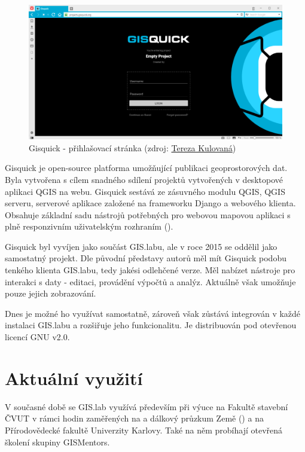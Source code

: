 \begin{figure}[H] \centering
    \includegraphics[width=400pt]{./pictures/gisquick-welcome-screen.png}
    \caption[Gisquick - přihlašovací stránka]{Gisquick - přihlašovací stránka (zdroj:
	\href{}{Tereza Kulovaná})}
    \label{fig:gisquick-welcome}
\end{figure}

Gisquick je open-source platforma umožňující publikaci geoprostorových
dat. Byla vytvořena s cílem snadného sdílení projektů vytvořených v
desktopové aplikaci QGIS na webu. Gisquick sestává ze zásuvného modulu
QGIS, QGIS serveru, serverové aplikace založené na frameworku Django a 
webového klienta. Obsahuje základní sadu nástrojů
potřebných pro webovou mapovou aplikaci s plně responzivním uživatelským
rozhraním ().

Gisquick byl vyvíjen jako součást GIS.labu, ale v roce 2015 se oddělil
jako samostatný projekt. Dle původní představy autorů měl mít Gisquick
podobu tenkého klienta GIS.labu, tedy jakési odlehčené verze. Měl 
nabízet nástroje pro interakci s daty - editaci, provádění výpočtů a analýz.
Aktuálně však umožňuje pouze jejich zobrazování. 

Dnes je možné ho využívat samostatně, zároveň však zůstává integrován 
v každé instalaci GIS.labu a rozšiřuje jeho funkcionalitu. Je distribuován 
pod otevřenou licencí GNU  v2.0.

\section{Aktuální využití}
\label{gislab-vyuziti}

V současné době se GIS.lab využívá především při výuce na Fakultě
stavební ČVUT v rámci hodin zaměřených na  a dálkový průzkum
Země () a na Přírodovědecké fakultě Univerzity Karlovy. Také na něm probíhají otevřená školení skupiny
GISMentors.


